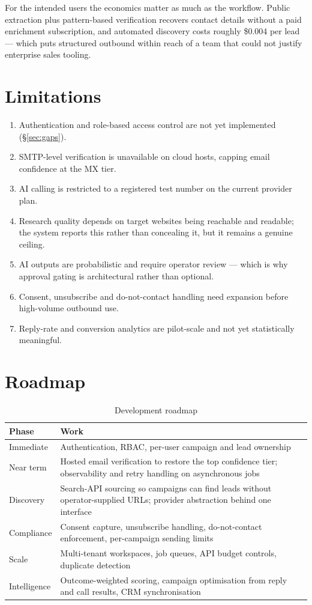 \documentclass[11pt,a4paper]{report}
\begin{document}
For the intended users the economics matter as much as the workflow. Public extraction plus pattern-based verification recovers contact details without a paid enrichment subscription, and automated discovery costs roughly \$0.004 per lead --- which puts structured outbound within reach of a team that could not justify enterprise sales tooling.

\section{Limitations}
\begin{enumerate}[leftmargin=1.4em,itemsep=2pt]
  \item Authentication and role-based access control are not yet implemented (\S\ref{sec:gaps}).
  \item SMTP-level verification is unavailable on cloud hosts, capping email confidence at the MX tier.
  \item AI calling is restricted to a registered test number on the current provider plan.
  \item Research quality depends on target websites being reachable and readable; the system reports this rather than concealing it, but it remains a genuine ceiling.
  \item AI outputs are probabilistic and require operator review --- which is why approval gating is architectural rather than optional.
  \item Consent, unsubscribe and do-not-contact handling need expansion before high-volume outbound use.
  \item Reply-rate and conversion analytics are pilot-scale and not yet statistically meaningful.
\end{enumerate}

\section{Roadmap}
\begin{table}[H]
\centering
\caption{Development roadmap}
\small
\begin{tabularx}{\textwidth}{p{3.0cm} X}
\toprule
Phase & Work \\
\midrule
Immediate & Authentication, RBAC, per-user campaign and lead ownership \\
Near term & Hosted email verification to restore the top confidence tier; observability and retry handling on asynchronous jobs \\
Discovery & Search-API sourcing so campaigns can find leads without operator-supplied URLs; provider abstraction behind one interface \\
Compliance & Consent capture, unsubscribe handling, do-not-contact enforcement, per-campaign sending limits \\
Scale & Multi-tenant workspaces, job queues, API budget controls, duplicate detection \\
Intelligence & Outcome-weighted scoring, campaign optimisation from reply and call results, CRM synchronisation \\
\bottomrule
\end{tabularx}
\end{table}
\end{document}
